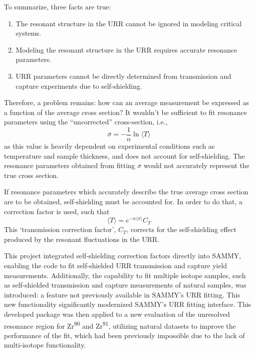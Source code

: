     To summarize, three facts are true:
    \begin{enumerate}
        \item The resonant structure in the URR cannot be ignored in modeling critical systems.
        \item Modeling the resonant structure in the URR requires accurate resonance parameters.
        \item URR parameters cannot be directly determined from transmission and capture experiments due to self-shielding.
    \end{enumerate}

    Therefore, a problem remains: how can an average measurement be expressed as a function of the average cross section? It wouldn't be sufficient to fit resonance parameters using the ``uncorrected'' cross-section, i.e.,
    \begin{equation}
        \overline{\sigma} = -\frac{1}{n} \ln{\langle T \rangle}
    \end{equation}
    as this value is heavily dependent on experimental conditions such as temperature and sample thickness, and does not account for self-shielding. The resonance parameters obtained from fitting $\overline{\sigma}$ would not accurately represent the true cross section.

    If resonance parameters which accurately describe the true average cross section are to be obtained, self-shielding must be accounted for. In order to do that, a correction factor is used, such that
    \begin{equation}
        \label{eq:self-shielded-transmission}
        \langle T \rangle = e^{-n \langle \sigma \rangle} C_T
    \end{equation}
    This `transmission correction factor', $C_T$, corrects for the self-shielding effect produced by the resonant fluctuations in the URR.

    This project integrated self-shielding correction factors directly into SAMMY, enabling the code to fit self-shielded URR transmission and capture yield measurements. Additionally, the capability to fit multiple isotope samples, such as self-shielded transmission and capture measurements of natural samples, was introduced: a feature not previously available in SAMMY's URR fitting. This new functionality significantly modernized SAMMY's URR fitting interface. This developed package was then applied to a new evaluation of the unresolved resonance region for Zr\textsuperscript{90} and Zr\textsuperscript{91}, utilizing natural datasets to improve the performance of the fit, which had been previously impossible due to the lack of multi-isotope functionality.